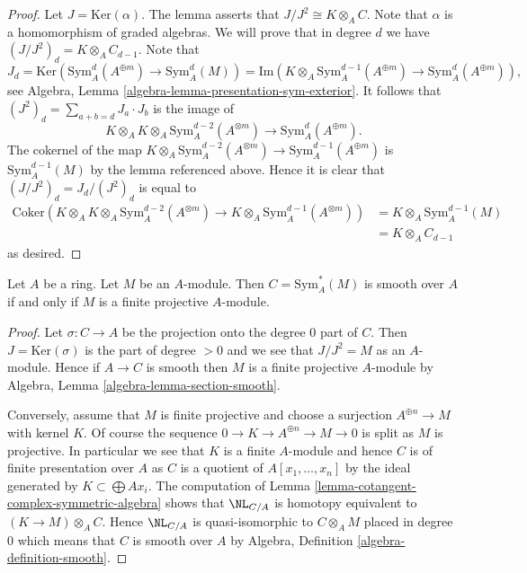 \begin{proof}
Let $J = \text{Ker}(\alpha)$. The lemma asserts that
$J/J^2 \cong K \otimes_A C$. Note that $\alpha$ is a homomorphism
of graded algebras. We will prove that in degree $d$ we have
$(J/J^2)_d = K \otimes_A C_{d - 1}$. Note that
$$
J_d = \text{Ker}(\text{Sym}^d_A(A^{\oplus m}) \to \text{Sym}^d_A(M))
= \text{Im}(K \otimes_A \text{Sym}^{d - 1}_A(A^{\oplus m})
\to \text{Sym}^d_A(A^{\oplus m})),
$$
see Algebra, Lemma \ref{algebra-lemma-presentation-sym-exterior}.
It follows that $(J^2)_d = \sum_{a + b = d} J_a \cdot J_b$ is the image of
$$
K \otimes_A K \otimes_A \text{Sym}^{d - 2}_A(A^{\otimes m})
\to \text{Sym}^d_A(A^{\oplus m}).
$$
The cokernel of the map $K \otimes_A \text{Sym}^{d - 2}_A(A^{\otimes m}) \to
\text{Sym}^{d - 1}_A(A^{\oplus m})$ is $\text{Sym}^{d - 1}_A(M)$ by
the lemma referenced above.
Hence it is clear that $(J/J^2)_d = J_d/(J^2)_d$ is equal to
\begin{align*}
\text{Coker}(
K \otimes_A K \otimes_A \text{Sym}^{d - 2}_A(A^{\otimes m})
\to K \otimes_A \text{Sym}^{d - 1}_A(A^{\otimes m}))
& = K \otimes_A \text{Sym}^{d - 1}_A(M) \\
& = K \otimes_A C_{d -1}
\end{align*}
as desired.
\end{proof}

\begin{lemma}
\label{lemma-symmetric-algebra-smooth}
Let $A$ be a ring. Let $M$ be an $A$-module. Then $C = \text{Sym}_A^*(M)$
is smooth over $A$ if and only if $M$ is a finite projective $A$-module.
\end{lemma}

\begin{proof}
Let $\sigma : C \to A$ be the projection onto the degree $0$ part of $C$.
Then $J = \text{Ker}(\sigma)$ is the part of degree $> 0$ and we see that
$J/J^2 = M$ as an $A$-module. Hence if $A \to C$ is smooth then $M$ is
a finite projective $A$-module by
Algebra, Lemma \ref{algebra-lemma-section-smooth}.

\medskip\noindent
Conversely, assume that $M$ is finite projective and choose a surjection
$A^{\oplus n} \to M$ with kernel $K$. Of course the sequence
$0 \to K \to A^{\oplus n} \to M \to 0$ is split as $M$ is projective.
In particular we see that $K$ is a finite $A$-module and hence
$C$ is of finite presentation over $A$ as $C$ is a quotient of
$A[x_1, \ldots, x_n]$ by the ideal generated by $K \subset \bigoplus Ax_i$.
The computation of Lemma \ref{lemma-cotangent-complex-symmetric-algebra}
shows that $\NL_{C/A}$ is homotopy equivalent to $(K \to M) \otimes_A C$.
Hence $\NL_{C/A}$ is quasi-isomorphic to $C \otimes_A M$ placed in degree
$0$ which means that $C$ is smooth over $A$ by
Algebra, Definition \ref{algebra-definition-smooth}.
\end{proof}

